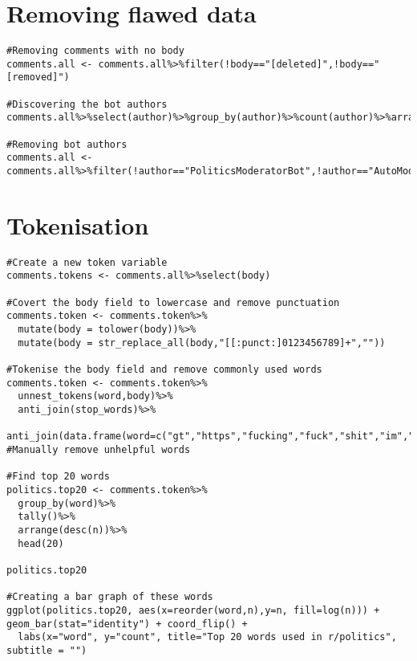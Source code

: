 \section{Removing flawed data}
\label{sec:AppendexA3}
\begin{lstlisting}
#Removing comments with no body
comments.all <- comments.all%>%filter(!body=="[deleted]",!body=="[removed]")

#Discovering the bot authors
comments.all%>%select(author)%>%group_by(author)%>%count(author)%>%arrange(desc(n))

#Removing bot authors
comments.all <- comments.all%>%filter(!author=="PoliticsModeratorBot",!author=="AutoModerator")

\end{lstlisting}

\section{Tokenisation}
\label{sec:AppendexA4}
\begin{lstlisting}
#Create a new token variable
comments.tokens <- comments.all%>%select(body)

#Covert the body field to lowercase and remove punctuation
comments.token <- comments.token%>%
  mutate(body = tolower(body))%>%
  mutate(body = str_replace_all(body,"[[:punct:]0123456789]+",""))

#Tokenise the body field and remove commonly used words
comments.token <- comments.token%>%
  unnest_tokens(word,body)%>%
  anti_join(stop_words)%>%
  anti_join(data.frame(word=c("gt","https","fucking","fuck","shit","im","youre","dont","yeah","hes","isnt","didnt","theyre","doesnt")))%>% #Manually remove unhelpful words

#Find top 20 words
politics.top20 <- comments.token%>%
  group_by(word)%>%
  tally()%>%
  arrange(desc(n))%>%
  head(20)
  
politics.top20

#Creating a bar graph of these words
ggplot(politics.top20, aes(x=reorder(word,n),y=n, fill=log(n))) + geom_bar(stat="identity") + coord_flip() + 
  labs(x="word", y="count", title="Top 20 words used in r/politics", subtitle = "")


\end{lstlisting}


